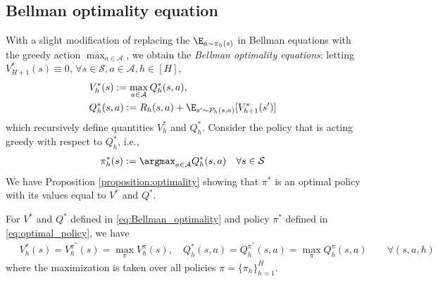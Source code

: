 \subsection{Bellman optimality equation}
With a slight modification of replacing the $\E_{a \sim \pi_h(s)}$ in Bellman equations with the greedy action $\max_{a\in\mathcal{A}}$, we obtain the {\em Bellman optimality equations}:
letting $V^*_{H+1}(s)\equiv0$, $\forall s\in\mathcal{S},a\in\mathcal{A},h\in[H]$,
\begin{align}
\begin{split}\label{eq:Bellman_optimality}
& V_h^*(s):=\max_{a\in\mathcal{A}}  Q_h^*(s, a),\\
& Q_h^*(s, a):=R_h(s, a)+\E_{s' \sim P_h( s, a)}[V_{h+1}^*(s')]
\end{split}
\end{align}
which recursively define quantities $V^*_h$ and $Q^*_h$.
Consider the policy that is acting greedy with respect to $Q^*_h$, i.e.,
\begin{align}\label{eq:optimal_policy}
    \pi^*_h(s) := \argmax_{a\in\mathcal{A}} Q^*_h(s,a) \quad\forall s\in\mathcal{S}
\end{align}
We have Proposition \ref{proposition:optimality} showing that $\pi^*$ is an optimal policy with its values equal to $V^*$ and $Q^*$.
\begin{proposition}
\label{proposition:optimality}
For $V^*$ and $Q^*$ defined in \eqref{eq:Bellman_optimality} and policy $\pi^*$ defined in \eqref{eq:optimal_policy}, we have
\begin{align*}
    \quad V_h^*(s)=V^{\pi^*}_h(s)=\max _\pi V_h^\pi(s), \quad Q_h^*(s, a)=Q^{\pi^*}_h(s,a)=\max _\pi Q_h^\pi(s, a)
    \qquad\forall(s, a, h)
\end{align*}
where the maximization is taken over all policies $\pi=\{\pi_h\}_{h=1}^H$.
\end{proposition}
